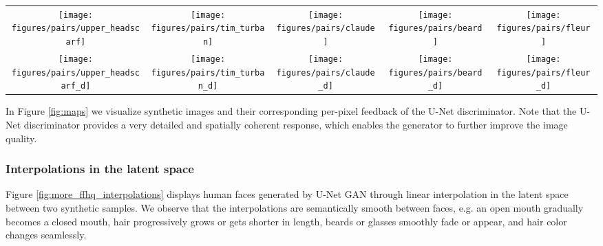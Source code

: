 \documentclass[10pt,twocolumn,letterpaper]{article}
\begin{document}
\begin{figure*}
\begin{centering}
\begin{tabular}{@{}c@{\hskip 0.05in }c@{\hskip 0.05in }c@{\hskip 0.05in }c@{\hskip 0.05in }c@{}}
		
			{\footnotesize{}}\texttt{[image: figures/pairs/upper\_headscarf]} &
			{\footnotesize{}}\texttt{[image: figures/pairs/tim\_turban]} &
				{\footnotesize{}}\texttt{[image: figures/pairs/claude]} &
				{\footnotesize{}}\texttt{[image: figures/pairs/beard]} &
			{\footnotesize{}}\texttt{[image: figures/pairs/fleur]} \\
			
		
			{\footnotesize{}}\texttt{[image: figures/pairs/upper\_headscarf\_d]} &
			{\footnotesize{}}\texttt{[image: figures/pairs/tim\_turban\_d]} &
				{\footnotesize{}}\texttt{[image: figures/pairs/claude\_d]} &
			{\footnotesize{}}\texttt{[image: figures/pairs/beard\_d]}&
			{\footnotesize{}}\texttt{[image: figures/pairs/fleur\_d]} \\
			
		
			

		\end{tabular}

		\par\end{centering}
	\caption{\label{fig:maps} Samples generated by U-Net GAN and the corresponding real-fake predictions of the U-Net decoder. Brighter colors correspond to the discriminator confidence of pixel being real (and darker of being fake).}
\end{figure*}
 In Figure \ref{fig:maps} we visualize synthetic images and their corresponding per-pixel feedback of the U-Net discriminator. Note that the U-Net discriminator provides a very detailed and spatially coherent response, which enables the generator to further improve the image quality.


\subsubsection*{Interpolations in the latent space}
Figure \ref{fig:more_ffhq_interpolations} displays human faces generated by U-Net GAN through linear interpolation in the latent space between two synthetic samples. We observe that the interpolations are semantically smooth between faces, e.g. an open mouth gradually becomes a closed mouth, hair progressively grows or gets shorter in length, beards or glasses smoothly fade or appear, and hair color changes seamlessly. 
\end{document}
